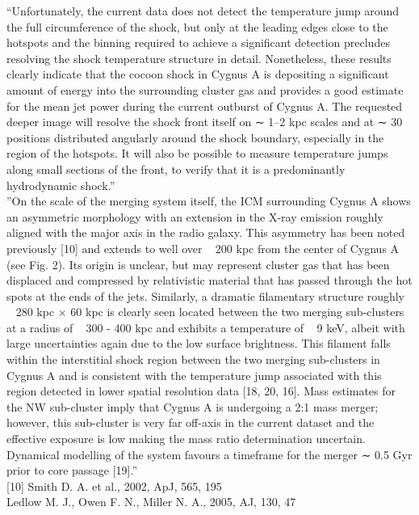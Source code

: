 \documentclass[MScProj_TLRH_ClusterEnergy.tex]{subfiles}
\begin{document}
``Unfortunately, the current data does not detect the temperature jump around the full circumference of the shock, but only at the leading edges close to the hotspots and the binning required to achieve a significant detection precludes resolving the shock temperature structure in detail. Nonetheless, these results clearly indicate that the cocoon shock in Cygnus A is depositing a significant amount of energy into the surrounding cluster gas and provides a good estimate for the mean jet power during the current outburst of Cygnus A. The requested deeper image will resolve the shock front itself on ∼ 1–2 kpc scales and at ∼ 30 positions distributed angularly around the shock boundary, especially in the region of the hotspots. It will also be possible to measure temperature jumps along small sections of the front, to verify that it is a predominantly hydrodynamic shock.'' \\

''On the scale of the merging system itself, the ICM surrounding Cygnus A shows an asymmetric morphology with an extension in the X-ray emission roughly aligned with the major axis in the radio galaxy. This asymmetry has been noted previously [10] and extends to well over ~ 200 kpc from the center of Cygnus A (see Fig. 2). Its origin is unclear, but may represent cluster gas that has been displaced and compressed by relativistic material that has passed through the hot spots at the ends of the jets. Similarly, a dramatic filamentary structure roughly ~ 280 kpc $\times$ 60 kpc is clearly seen located between the two merging sub-clusters at a radius of ~ 300 - 400 kpc and exhibits a temperature of ~ 9 keV, albeit with large uncertainties again due to the low surface brightness. This filament falls within the interstitial shock region between the two merging sub-clusters in Cygnus A and is consistent with the temperature jump associated with this region detected in lower spatial resolution data [18, 20, 16]. Mass estimates for the NW sub-cluster imply that Cygnus A is undergoing a 2:1 mass merger; however, this sub-cluster is very far off-axis in the current dataset and the effective exposure is low making the mass ratio determination uncertain. Dynamical modelling of the system favours a timeframe for the merger ∼ 0.5 Gyr prior to core passage [19].''\\

[10] Smith D. A. et al., 2002, ApJ, 565, 195 \\
[19] Ledlow M. J., Owen F. N., Miller N. A., 2005, AJ, 130, 47 \\
\end{document}
